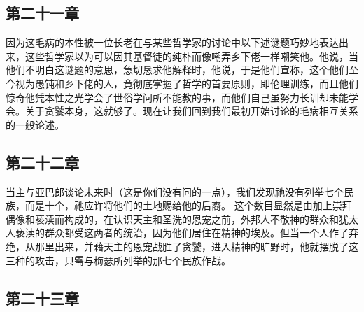 \subsection{第二十一章}

\par

因为这毛病的本性被一位长老在与某些哲学家的讨论中以下述谜题巧妙地表达出来，这些哲学家以为可以因其基督徒的纯朴而像嘲弄乡下佬一样嘲笑他。他说，当他们不明白这谜题的意思，急切恳求他解释时，他说，于是他们宣称，这个他们至今视为愚钝和乡下佬的人，竟彻底掌握了哲学的首要原则，即伦理训练，而且他们惊奇他凭本性之光学会了世俗学问所不能教的事，而他们自己虽努力长训却未能学会。关于贪饕本身，这就够了。现在让我们回到我们最初开始讨论的毛病相互关系的一般论述。\par


\subsection{第二十二章}

\par

当主与亚巴郎谈论未来时（这是你们没有问的一点），我们发现祂没有列举七个民族，而是十个，祂应许将他们的土地赐给他的后裔。 这个数目显然是由加上崇拜偶像和亵渎而构成的，在认识天主和圣洗的恩宠之前，外邦人不敬神的群众和犹太人亵渎的群众都受这两者的统治，因为他们居住在精神的埃及。但当一个人作了弃绝，从那里出来，并藉天主的恩宠战胜了贪饕，进入精神的旷野时，他就摆脱了这三种的攻击，只需与梅瑟所列举的那七个民族作战。\par


\subsection{第二十三章}

